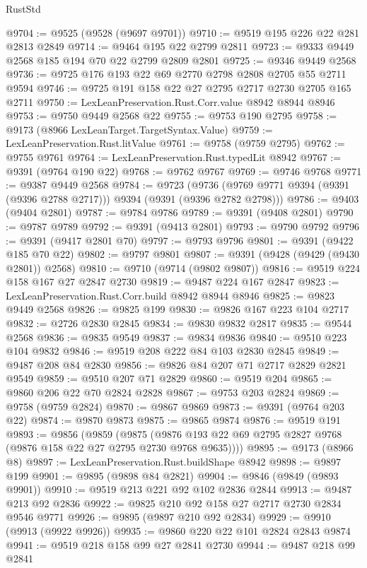 \begin{lexlean}{RustStd}
\begin{coremodule}
@9704 := @9525 (@9528 (@9697 @9701))
@9710 := @9519 @195 @226 @22 @281 @2813 @2849
@9714 := @9464 @195 @22 @2799 @2811
@9723 := @9333 @9449 @2568 @185 @194 @70 @22 @2799 @2809 @2801
@9725 := @9346 @9449 @2568
@9736 := @9725 @176 @193 @22 @69 @2770 @2798 @2808 @2705 @55 @2711 @9594
@9746 := @9725 @191 @158 @22 @27 @2795 @2717 @2730 @2705 @165 @2711
@9750 := LexLeanPreservation.Rust.Corr.value @8942 @8944 @8946
@9753 := @9750 @9449 @2568 @22
@9755 := @9753 @190 @2795
@9758 := @9173 (@8966 LexLeanTarget.TargetSyntax.Value)
@9759 := LexLeanPreservation.Rust.litValue
@9761 := @9758 (@9759 @2795)
@9762 := @9755 @9761
@9764 := LexLeanPreservation.Rust.typedLit @8942
@9767 := @9391 (@9764 @190 @22)
@9768 := @9762 @9767
@9769 := @9746 @9768
@9771 := @9387 @9449 @2568
@9784 := @9723
    (@9736 (@9769 @9771 @9394 (@9391 (@9396 @2788 @2717))) @9394 (@9391 (@9396 @2782 @2798)))
@9786 := @9403 (@9404 @2801)
@9787 := @9784 @9786
@9789 := @9391 (@9408 @2801)
@9790 := @9787 @9789
@9792 := @9391 (@9413 @2801)
@9793 := @9790 @9792
@9796 := @9391 (@9417 @2801 @70)
@9797 := @9793 @9796
@9801 := @9391 (@9422 @185 @70 @22)
@9802 := @9797 @9801
@9807 := @9391 (@9428 (@9429 (@9430 @2801)) @2568)
@9810 := @9710 (@9714 (@9802 @9807))
@9816 := @9519 @224 @158 @167 @27 @2847 @2730
@9819 := @9487 @224 @167 @2847
@9823 := LexLeanPreservation.Rust.Corr.build @8942 @8944 @8946
@9825 := @9823 @9449 @2568
@9826 := @9825 @199
@9830 := @9826 @167 @223 @104 @2717
@9832 := @2726 @2830 @2845
@9834 := @9830 @9832 @2817
@9835 := @9544 @2568
@9836 := @9835 @9549
@9837 := @9834 @9836
@9840 := @9510 @223 @104 @9832
@9846 := @9519 @208 @222 @84 @103 @2830 @2845
@9849 := @9487 @208 @84 @2830
@9856 := @9826 @84 @207 @71 @2717 @2829 @2821 @9549
@9859 := @9510 @207 @71 @2829
@9860 := @9519 @204
@9865 := @9860 @206 @22 @70 @2824 @2828
@9867 := @9753 @203 @2824
@9869 := @9758 (@9759 @2824)
@9870 := @9867 @9869
@9873 := @9391 (@9764 @203 @22)
@9874 := @9870 @9873
@9875 := @9865 @9874
@9876 := @9519 @191
@9893 := @9856
    (@9859
      (@9875 (@9876 @193 @22 @69 @2795 @2827 @9768 (@9876 @158 @22 @27 @2795 @2730 @9768 @9635))))
@9895 := @9173 (@8966 @8)
@9897 := LexLeanPreservation.Rust.buildShape @8942
@9898 := @9897 @199
@9901 := @9895 (@9898 @84 @2821)
@9904 := @9846 (@9849 (@9893 @9901))
@9910 := @9519 @213 @221 @92 @102 @2836 @2844
@9913 := @9487 @213 @92 @2836
@9922 := @9825 @210 @92 @158 @27 @2717 @2730 @2834 @9546 @9771
@9926 := @9895 (@9897 @210 @92 @2834)
@9929 := @9910 (@9913 (@9922 @9926))
@9935 := @9860 @220 @22 @101 @2824 @2843 @9874
@9941 := @9519 @218 @158 @99 @27 @2841 @2730
@9944 := @9487 @218 @99 @2841

\end{coremodule}
\end{lexlean}
